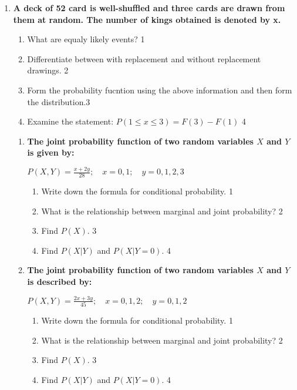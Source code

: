 \documentclass[a4paper,oneside, margin=1.4in]{book}
\begin{document}
  \begin{enumerate}
  
 \item
	  \textbf{A deck of 52 card is well-shuffled and three cards are drawn from them at random. The number of kings obtained is denoted by x.} 
  
  \begin{enumerate}
    \item
	What are equaly likely events? \hfill 1
    \item
	Differentiate between with replacement and without replacement drawings. \hfill 2
    \item  
	Form the probability fucntion using the above information and then form the distribution.\hfill 3
    \item
	Examine the statement: $P(1 \le x \le 3) = F(3)-F(1)$ \hfill 4
  \end{enumerate}
  
\begin{enumerate}

  \item
  \textbf{The joint probability function of two random variables \( X \) and \( Y \) is given by:}
  
  \begin{center}
  \( \displaystyle P(X,Y) = \frac{x + 2y}{28}; \quad x = 0, 1; \quad y = 0, 1, 2, 3 \)
  \end{center}
 
  \begin{enumerate}
    \item
    	Write down the formula for conditional probability. \hfill 1
    \item
    	What is the relationship between marginal and joint probability? \hfill 2
    \item
    	Find \( P(X) \). \hfill 3
    \item
     	Find \( P(X \vert Y) \) and \( P(X \vert Y = 0) \). \hfill 4
  \end{enumerate}

  \item
  \textbf{The joint probability function of two random variables \( X \) and \( Y \) is described by:}
  
  \begin{center}
  \( \displaystyle P(X,Y) = \frac{2x + 3y}{45}; \quad x = 0, 1, 2; \quad y = 0, 1, 2 \)
  \end{center}
 
  \begin{enumerate}
    \item
    	Write down the formula for conditional probability. \hfill 1
    \item
    	What is the relationship between marginal and joint probability? \hfill 2
    \item
    	Find \( P(X) \). \hfill 3
    \item
     	Find \( P(X \vert Y) \) and \( P(X \vert Y = 0) \). \hfill 4
  \end{enumerate}


\end{enumerate}
\end{enumerate}
\end{document}
